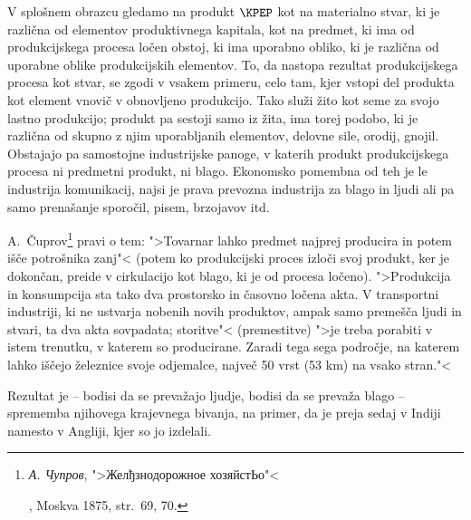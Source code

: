 \documentclass[kapital_02.tex]{subfiles}
\begin{document}
V splošnem obrazcu gledamo na produkt \(\KPEP\) kot na materialno stvar, ki je različna od elementov produktivnega kapitala, kot na predmet, ki ima od produkcijskega procesa ločen obstoj, ki ima uporabno obliko, ki je različna od uporabne oblike produkcijskih elementov. To, da nastopa rezultat produkcijskega procesa kot stvar, se zgodi v vsakem primeru, celo tam, kjer vstopi del produkta kot element vnovič v obnovljeno produkcijo. Tako služi žito kot seme za svojo lastno produkcijo; produkt pa sestoji samo iz žita, ima torej podobo, ki je različna od skupno z njim uporabljanih elementov, delovne sile, orodij, gnojil. Obstajajo pa samostojne industrijske panoge, v katerih produkt produkcijskega procesa ni predmetni produkt, ni blago. Ekonomsko pomembna od teh je le industrija komunikacij, najsi je prava prevozna industrija za blago in ljudi ali pa samo prenašanje sporočil, pisem, brzojavov itd.

A.~Čuprov\footnote{\begin{otherlanguage}{russian}\emph{А. Чупров}, ">Желђзнодорожное хозяйстЬо"<\end{otherlanguage}, Moskva 1875, str.\ 69, 70.} pravi o tem: ">Tovarnar lahko predmet najprej producira in potem išče potrošnika zanj"< (potem ko produkcijski proces izloči svoj produkt, ker je dokončan, preide \KPEstran v cirkulacijo kot blago, ki je od procesa ločeno). ">Produkcija in konsumpcija sta tako dva prostorsko in časovno ločena akta. V transportni industriji, ki ne ustvarja nobenih novih produktov, ampak samo premešča ljudi in stvari, ta dva akta sovpadata; storitve"< (premestitve) ">je treba porabiti v istem trenutku, v katerem so producirane. Zaradi tega sega področje, na katerem lahko iščejo železnice svoje odjemalce, največ 50 vrst (53 km) na vsako stran."<

Rezultat je -- bodisi da se prevažajo ljudje, bodisi da se prevaža blago -- sprememba njihovega krajevnega bivanja, na primer, da je preja sedaj v Indiji namesto v Angliji, kjer so jo izdelali.
\end{document}
